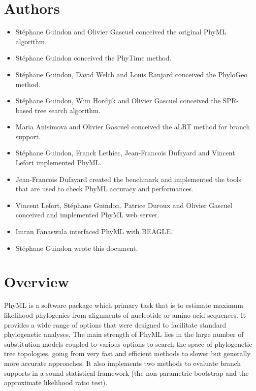 \documentclass[a4paper,12pt]{article}
\begin{document}
{
\noindent
\setlength{\baselineskip}{0.7\baselineskip}
\section{Authors}
\begin{itemize}
\item { St\'ephane Guindon} and { Olivier Gascuel} conceived the original PhyML algorithm.
\item { St\'ephane Guindon} conceived the PhyTime method.
\item { St\'ephane Guindon, David Welch and Louis Ranjard} conceived the PhyloGeo method.
\item { St\'ephane Guindon, Wim Hordjik} and { Olivier Gascuel} conceived the SPR-based tree search algorithm.
\item { Maria Anisimova} and { Olivier Gascuel} conceived the aLRT method for branch support.
\item { St\'ephane Guindon, Franck Lethiec}, Jean-Francois Dufayard and Vincent Lefort implemented PhyML.
\item { Jean-Francois Dufayard} created the benchmark and implemented the tools that are used to check
  PhyML accuracy and performances.
\item { Vincent Lefort, St\'ephane Guindon, Patrice Duroux} and { Olivier Gascuel} conceived and
  implemented PhyML web server.
\item { Imran Fanaswala} interfaced PhyML with BEAGLE.
\item St\'ephane Guindon wrote this document.
\end{itemize}
}
\clearpage

\section{Overview}

PhyML  \cite{guindon03} is  a  software  package which  primary  task that  is  to estimate  maximum
likelihood phylogenies  from alignments of nucleotide or  amino-acid sequences.  It  provides a wide
range  of  options that  were  designed  to facilitate  standard  phylogenetic  analyses.  The  main
strength of  PhyML lies in the  large number of substitution  models coupled to  various options to
search the  space of phylogenetic  tree topologies,  going from very  fast and efficient  methods to
slower but  generally more accurate approaches.  It  also implements two methods  to evaluate branch
supports  in  a  sound statistical  framework  (the  non-parametric  bootstrap and  the  approximate
likelihood ratio test).
\end{document}
